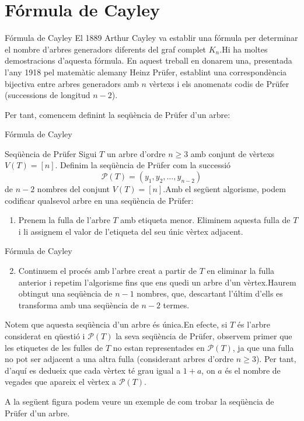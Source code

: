 \documentclass{beamer}
\begin{document}
\section{Fórmula de Cayley}
\begin{frame}{Fórmula de Cayley}
    El 1889 Arthur Cayley va establir una fórmula per determinar el nombre d'arbres generadors diferents del graf complet $K_n$.\pause\space Hi ha moltes demostracions d'aquesta fórmula. En aquest treball en donarem una, presentada l'any 1918 pel matemàtic alemany Heinz Prüfer, establint una correspondència bijectiva entre arbres generadors amb $n$ vèrtexs i els anomenats codis de Prüfer (successions de longitud $n-2$). \pause\par Per tant, comencem definint la seqüència de Prüfer d'un arbre:
\end{frame}
\begin{frame}{Fórmula de Cayley}
    \begin{block}{Seqüència de Prüfer}
        Sigui $T$ un arbre d'ordre $n \geq 3$ amb conjunt de vèrtexs $V(T)= [n]$. Definim la seqüència de Prüfer com la successió
        $$\mathcal{P}(T)=(y_1,y_2,\ldots,y_{n-2})$$
        de $n-2$ nombres del conjunt $V(T)=[n]$.\pause\space Amb el següent algorisme, podem codificar qualsevol arbre en una seqüència de Prüfer:
        \begin{enumerate}
            \item Prenem la fulla de l'arbre $T$ amb etiqueta menor. Eliminem aquesta fulla de $T$ i li assignem el valor de l'etiqueta del seu únic vèrtex adjacent.
        \end{enumerate}
    \end{block}
\end{frame}
\begin{frame}{Fórmula de Cayley}
    \begin{block}{}
        \begin{enumerate}
            \setcounter{enumi}{1}
            \item Continuem el procés amb l'arbre creat a partir de $T$ en eliminar la fulla anterior i repetim l'algorisme fins que ens quedi un arbre d'un vèrtex.\pause\space Haurem obtingut una seqüència de $n-1$ nombres, que, descartant l'últim d'ells es transforma amb una seqüència de $n-2$ termes.
        \end{enumerate}
    \end{block}\pause
    Notem que aquesta seqüència d'un arbre és única.\pause\space En efecte, si $T$ és l'arbre considerat en qüestió i $\mathcal{P}(T)$ la seva seqüència de Prüfer, observem primer que les etiquetes de les fulles de $T$ no estan representades en $\mathcal{P}(T)$, ja que una fulla no pot ser adjacent a una altra fulla (considerant arbres d'ordre $n\geq 3$). Per tant, d'aquí es dedueix que cada vèrtex té grau igual a $1+a$, on $a$ és el nombre de vegades que apareix el vèrtex a $\mathcal{P}(T)$.\pause\par A la següent figura podem veure un exemple de com trobar la seqüència de Prüfer d'un arbre.
\end{frame}
\end{document}
